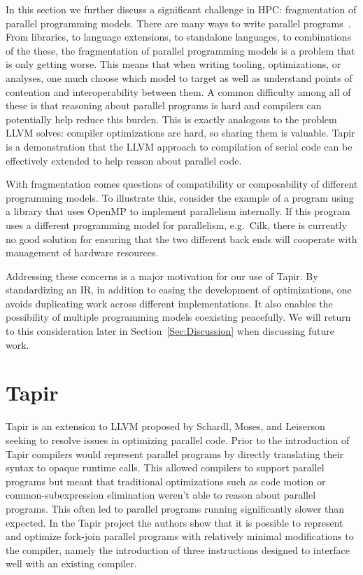 \documentclass[sigconf]{acmart}
\begin{document}
In this section we further discuss a significant challenge in HPC:
fragmentation of parallel programming models. There are many ways to write
parallel programs~\cite{openmp, qthreads, chapel, cilk, kokkos, legion, upc,
mpi}.  From libraries, to language extensions, to standalone languages, to
combinations of the these, the fragmentation of parallel programming models is a
problem that is only getting worse. This means that when writing tooling,
optimizations, or analyses, one much choose which model to target as well as
understand points of contention and interoperability between them. A common
difficulty among all of these is that reasoning about parallel programs is hard
and compilers can potentially help reduce this burden. This is exactly
analogous to the problem LLVM solves: compiler optimizations are hard, so
sharing them is valuable. Tapir is a demonstration that the LLVM approach to
compilation of serial code can be effectively extended to help reason about
parallel code. 

With fragmentation comes questions of compatibility or composability of 
different programming models. To illustrate this, consider the example of
a program using a library that uses OpenMP to implement parallelism internally. 
If this program uses a different programming model for parallelism, e.g.\ Cilk,
there is currently no good solution for ensuring that the two different back ends
will cooperate with management of hardware resources. 

Addressing these concerns is a major motivation for our use of Tapir.  By
standardizing an IR, in addition to easing the development of optimizations,
one avoids duplicating work across different implementations. It also enables
the possibility of multiple programming models coexisting peacefully. We will
return to this consideration later in Section~\ref{Sec:Discussion} when
discussing future work.

\section{Tapir} \label{Sec:Tapir}
Tapir is an extension to LLVM proposed by Schardl, Moses, and Leiserson
seeking to resolve issues in optimizing parallel code. Prior to
the introduction of Tapir compilers would represent parallel programs
by directly translating their syntax to opaque runtime calls. This allowed
compilers to support parallel programs but meant that traditional 
optimizations such as code motion or common-subexpression elimination weren't
able to reason about parallel programs. This often led to parallel programs
running significantly slower than expected. In the Tapir project the authors
show that it is possible to represent and optimize fork-join parallel programs
with relatively minimal modifications to the compiler, namely the introduction
of three instructions designed to interface well with an existing compiler.
\end{document}
